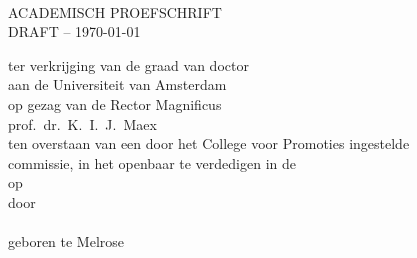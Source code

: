 
%
%

\pagestyle{empty}
\setlength\parindent{0pt}

\makeatletter
{}
\makeatother



\begin{minipage}[c][190mm][c]{124mm}  %
\makeatletter
\begin{center}
	\vspace*{1.2cm}

	{ \huge \bf \@title }\\[2.7cm]

	\textsc{\Large ACADEMISCH PROEFSCHRIFT}\\[1.2cm]
	\ifdraft \textsc{\Large DRAFT -- \today}\\[1.0cm] \fi

	\linespread{1.2}
	\large \textrm{
		ter verkrijging van de graad van doctor \\
		aan de Universiteit van Amsterdam \\
		op gezag van de Rector Magnificus \\
		prof.~dr.~K.~I.~J.~Maex \\
		ten overstaan van een door het College voor Promoties ingestelde \\
		commissie, in het openbaar te verdedigen in de \@location \\
		op \@date \\
		\vspace{0.9cm}
		door \\[0.3cm]
		\vspace{0.9cm}
		{\bf \@author}\\[0.3cm]
 		geboren te Melrose \\[0.3cm]  
	 }
\end{center}
\makeatother
\end{minipage}

